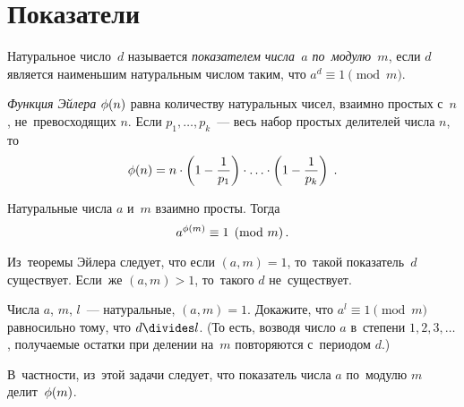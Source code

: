 
\section*{Показатели}


\begingroup \def\eulerphi{\mathrm{\phi}}

Натуральное число~$d$ называется \emph{показателем числа~$a$ по~модулю~$m$},
если $d$ является наименьшим натуральным числом таким, что
$a^d \equiv 1 \pmod{m}$.

\emph{Функция Эйлера} $\eulerphi(n)$ равна количеству натуральных чисел,
взаимно простых с~$n$, не~превосходящих $n$.
Если $p_1, \ldots, p_k$~--- весь набор простых делителей числа $n$,
то
\[
    \eulerphi(n)
=
    n
    \cdot
    \left( 1 - \frac{1}{p_1} \right)
    \cdot \ldots \cdot
    \left( 1 - \frac{1}{p_k} \right)
\; . \]

Натуральные числа $a$ и~$m$ взаимно просты.
Тогда
\[
    a^{\eulerphi(m)} \equiv 1 \pmod{m}
\, . \]

Из~теоремы Эйлера следует, что если $(a, m) = 1$, то~такой показатель~$d$
существует.
Если~же $(a, m) > 1$, то~такого $d$ не~существует.

\begin{problems}

\item
Числа $a$, $m$, $l$~--- натуральные, $(a, m) = 1$.
Докажите, что $a^l \equiv 1 \pmod{m}$ равносильно тому, что $d \divides l$.
(То есть, возводя число $a$ в~степени $1, 2, 3, \ldots$, получаемые остатки при
делении на~$m$ повторяются с~периодом $d$.)

\end{problems}

В~частности, из~этой задачи следует, что показатель числа $a$ по~модулю $m$
делит~$\eulerphi(m)$.

